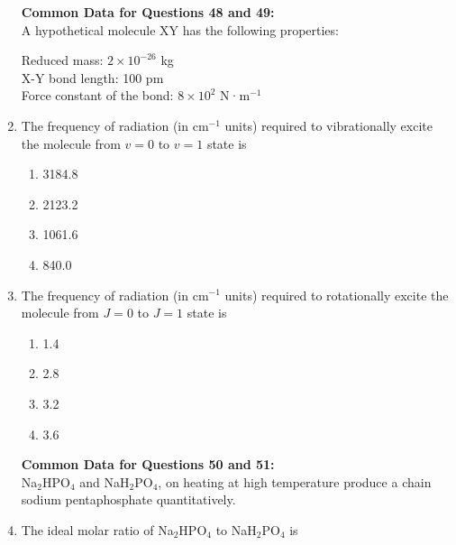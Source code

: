 \documentclass[journal,12pt,onecolumn]{IEEEtran}
\theoremstyle{remark}
\begin{document}
\begin{enumerate}
 

\noindent\textbf{Common Data for Questions 48 and 49:}\\
A hypothetical molecule XY has the following properties:

Reduced mass: \(2 \times 10^{-26}\) kg\\
X-Y bond length: 100 pm\\
Force constant of the bond: \(8 \times 10^2\) N·m\(^{-1}\)

 

\item    \hspace{0.5cm} The frequency of radiation (in cm\(^{-1}\) units) required to vibrationally excite the molecule from \(v = 0\) to \(v = 1\) state is  \hfill{}

\begin{multicols}{2}
\begin{enumerate}
    \item 3184.8
    \item 2123.2
    \item 1061.6
    \item 840.0
\end{enumerate}
\end{multicols}

 
\item    \hspace{0.5cm} The frequency of radiation (in cm\(^{-1}\) units) required to rotationally excite the molecule from \(J = 0\) to \(J = 1\) state is  \hfill{}

\begin{multicols}{2}
\begin{enumerate}
    \item 1.4
    \item 2.8
    \item 3.2
    \item 3.6
\end{enumerate}
\end{multicols}

 

\noindent\textbf{Common Data for Questions 50 and 51:}\\
Na\(_2\)HPO\(_4\) and NaH\(_2\)PO\(_4\), on heating at high temperature produce a chain sodium pentaphosphate quantitatively.

 

\item    \hspace{0.5cm} The ideal molar ratio of Na\(_2\)HPO\(_4\) to NaH\(_2\)PO\(_4\) is  \hfill{}


\end{enumerate}
\end{document}
